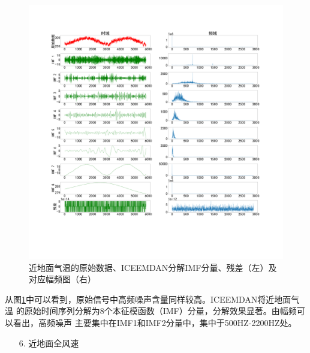 \documentclass[AutoFakeBold]{LZUThesis}
\begin{document}
\begin{figure}[H]
	\centering
    \includegraphics[width=1\textwidth]{figures/temp.pdf}
    \caption{近地面气温的原始数据、ICEEMDAN分解IMF分量、残差（左）及对应幅频图（右）}
    \label{fig_temp}
\end{figure}

从图\ref{fig_temp}中可以看到，原始信号中高频噪声含量同样较高。ICEEMDAN将近地面气温
的原始时间序列分解为8个本征模函数（IMF）分量，分解效果显著。由幅频可以看出，高频噪声
主要集中在IMF1和IMF2分量中，集中于500HZ-2200HZ处。

\begin{itemize}
    \item[6. ] 近地面全风速
\end{itemize}
\end{document}
